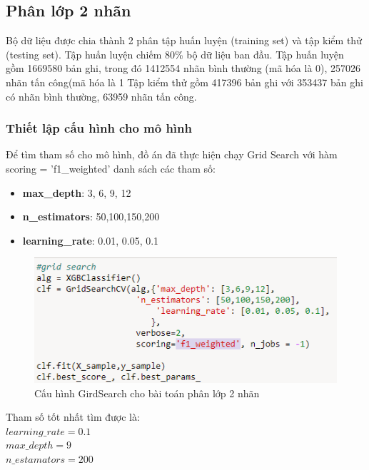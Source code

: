\subsection{Phân lớp 2 nhãn}
Bộ dữ liệu được chia thành 2 phân tập huấn luyện (training set) và tập kiểm thử (testing set). Tập huấn luyện chiếm 80\% bộ dữ liệu ban đầu. Tập huấn luyện gồm 1669580 bản ghi, trong đó 1412554 nhãn bình thường (mã hóa là 0), 257026 nhãn tấn công(mã hóa là 1
Tập kiểm thử gồm 417396 bản ghi với 353437 bản ghi có nhãn bình thường, 63959 nhãn tấn công.
\subsubsection*{Thiết lập cấu hình cho mô hình}
Để tìm tham số cho mô hình, đồ án đã thực hiện chạy Grid Search với hàm scoring = 'f1\_weighted' danh sách các tham số: 
\begin{itemize}
    \item \textbf{max\_depth}: 3, 6, 9, 12
    \item \textbf{n\_estimators}: 50,100,150,200
    \item \textbf{learning\_rate}: 0.01, 0.05, 0.1
\end{itemize}
\begin{figure}[H]
    \centering
    \includegraphics{bin_grid}
    \caption{Cấu hình GirdSearch cho bài toán phân lớp 2 nhãn}
\end{figure}
Tham số tốt nhất tìm được là: \\
$learning\_rate = 0.1$\\
$max\_depth = 9$\\
$n\_estamators = 200$\\

